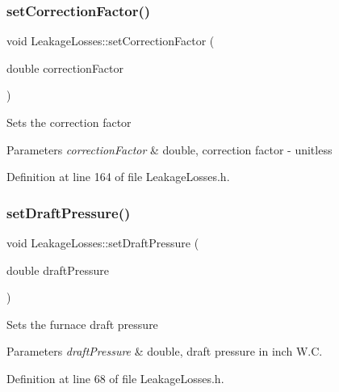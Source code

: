 \subsubsection{\texorpdfstring{set\+Correction\+Factor()}{setCorrectionFactor()}}
{\footnotesize\ttfamily void Leakage\+Losses\+::set\+Correction\+Factor (\begin{DoxyParamCaption}\item[{double}]{correction\+Factor }\end{DoxyParamCaption})\hspace{0.3cm}{\ttfamily [inline]}}

Sets the correction factor 
\begin{DoxyParams}{Parameters}
{\em correction\+Factor} & double, correction factor -\/ unitless \\
\hline
\end{DoxyParams}


Definition at line 164 of file Leakage\+Losses.\+h.

\mbox{\label{class_leakage_losses_a33f31dc336fc6af0fd1e8c8739f37b1a}} 
\subsubsection{\texorpdfstring{set\+Draft\+Pressure()}{setDraftPressure()}}
{\footnotesize\ttfamily void Leakage\+Losses\+::set\+Draft\+Pressure (\begin{DoxyParamCaption}\item[{double}]{draft\+Pressure }\end{DoxyParamCaption})\hspace{0.3cm}{\ttfamily [inline]}}

Sets the furnace draft pressure 
\begin{DoxyParams}{Parameters}
{\em draft\+Pressure} & double, draft pressure in inch W.\+C. \\
\hline
\end{DoxyParams}


Definition at line 68 of file Leakage\+Losses.\+h.

\mbox{\label{class_leakage_losses_a379c88c8dea822636a1b9966e2408daa}} 
